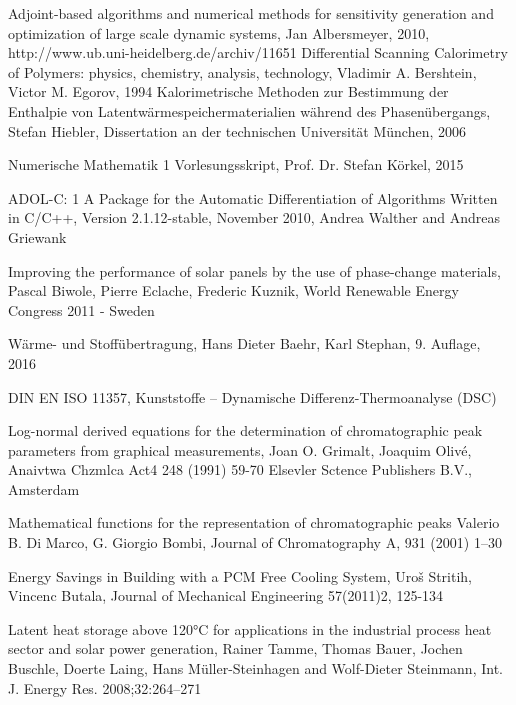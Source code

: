 \documentclass{scrartcl}[12pt, halfparskip]
\begin{document}
\begin{thebibliography}{9}

	 Adjoint-based algorithms and numerical methods for sensitivity generation and optimization of large scale dynamic systems, 
	 Jan Albersmeyer, 2010,
	 http://www.ub.uni-heidelberg.de/archiv/11651
	Differential Scanning Calorimetry of Polymers: physics, chemistry, analysis, technology,
	Vladimir A. Bershtein, Victor M. Egorov,
	1994
	Kalorimetrische Methoden zur Bestimmung
	der Enthalpie von Latentwärmespeichermaterialien
	während des Phasenübergangs,
	Stefan Hiebler, Dissertation an der technischen Universität München, 2006
	
	Numerische Mathematik 1 Vorlesungsskript, 
	Prof. Dr. Stefan Körkel, 2015

	ADOL-C: 1
	A Package for the Automatic Differentiation
	of Algorithms Written in C/C++,
	Version 2.1.12-stable, November 2010,
	Andrea Walther and Andreas Griewank
	
	Improving the performance of solar panels by the use of phase-change materials,
	Pascal Biwole, Pierre Eclache, Frederic Kuznik,
	World Renewable Energy Congress 2011 - Sweden
	
	Wärme- und Stoffübertragung,
	Hans Dieter Baehr, Karl Stephan,
	9. Auflage, 2016
	
	DIN EN ISO 11357, 
	Kunststoffe –
	Dynamische Differenz-Thermoanalyse (DSC)
	
	Log-normal derived equations for the determination
	of chromatographic peak parameters
	from graphical measurements,
	Joan O. Grimalt, Joaquim Olivé,
	Anaivtwa Chzmlca Act4 248 (1991) 59-70
	Elsevler Sctence Publishers B.V., Amsterdam
	
	Mathematical functions for the representation of chromatographic
	peaks
	Valerio B. Di Marco, G. Giorgio Bombi,
	Journal of Chromatography A, 931 (2001) 1–30
	
	Energy Savings in Building with a PCM Free Cooling System,
	Uroš Stritih, Vincenc Butala,
	Journal of Mechanical Engineering 57(2011)2, 125-134	
	
	Latent heat storage above 120°C for applications in the industrial process heat sector and solar power generation,
	Rainer Tamme, Thomas Bauer, Jochen Buschle, Doerte Laing, Hans Müller-Steinhagen and Wolf-Dieter Steinmann,
	Int. J. Energy Res. 2008;32:264–271
  
\end{thebibliography}
\end{document}
